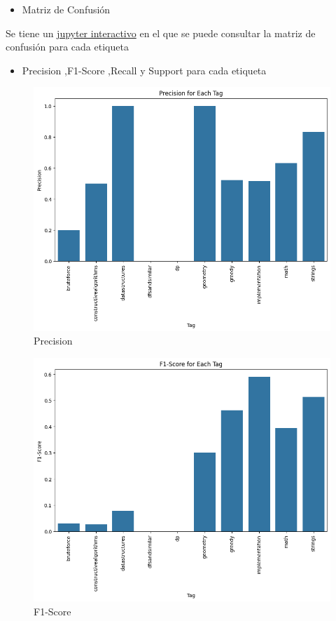 \documentclass{article}
\begin{document}
\begin{itemize}
    \item Matriz de Confusión
\end{itemize}
Se tiene un {\href{https://github.com/ARJ-Code/codeforce-tag-predictor/blob/main/src/naive\%20bayes\%20model/naive-bayes-model.ipynb}{jupyter interactivo}} en el que se puede consultar la matriz de confusión para cada etiqueta 
\newpage
\begin{itemize}
    \item Precision ,F1-Score ,Recall y Support para cada etiqueta
\end{itemize}
\begin{figure}[H]
    \centering
    \includegraphics[scale=0.49]{imgs/precisonnb.png}
    \caption{Precision}
    \label{fig:p}
\end{figure}
\begin{figure}[H]
    \centering
    \includegraphics[scale=0.49]{imgs/f1nb.png}
    \caption{F1-Score}
    \label{fig:f1}
\end{figure}
\end{document}
